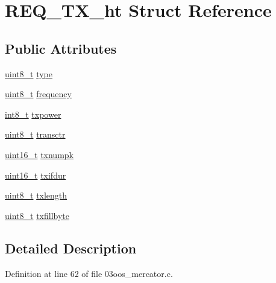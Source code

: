 \hypertarget{struct_r_e_q___t_x__ht}{}\section{R\+E\+Q\+\_\+\+T\+X\+\_\+ht Struct Reference}
\label{struct_r_e_q___t_x__ht}
\subsection*{Public Attributes}
\begin{DoxyCompactItemize}
\item 
\hyperlink{_p_e___types_8h_aba7bc1797add20fe3efdf37ced1182c5}{uint8\+\_\+t} \hyperlink{struct_r_e_q___t_x__ht_ac11d6ac1b582ca7e7b6dcacbb19af288}{type}
\item 
\hyperlink{_p_e___types_8h_aba7bc1797add20fe3efdf37ced1182c5}{uint8\+\_\+t} \hyperlink{struct_r_e_q___t_x__ht_a74c294feb13b830ee7158ad22ee13300}{frequency}
\item 
\hyperlink{_p_e___types_8h_aef44329758059c91c76d334e8fc09700}{int8\+\_\+t} \hyperlink{struct_r_e_q___t_x__ht_a5304263e364d8eb01026fa8375b48c04}{txpower}
\item 
\hyperlink{_p_e___types_8h_aba7bc1797add20fe3efdf37ced1182c5}{uint8\+\_\+t} \hyperlink{struct_r_e_q___t_x__ht_a4c78ef7cfae1a8937177c1cc2295636a}{transctr}
\item 
\hyperlink{_p_e___types_8h_a1f1825b69244eb3ad2c7165ddc99c956}{uint16\+\_\+t} \hyperlink{struct_r_e_q___t_x__ht_af4641683362ba6d5583558927f6b774f}{txnumpk}
\item 
\hyperlink{_p_e___types_8h_a1f1825b69244eb3ad2c7165ddc99c956}{uint16\+\_\+t} \hyperlink{struct_r_e_q___t_x__ht_a01136c9dfea9e9d4b5c07b27bbbd9663}{txifdur}
\item 
\hyperlink{_p_e___types_8h_aba7bc1797add20fe3efdf37ced1182c5}{uint8\+\_\+t} \hyperlink{struct_r_e_q___t_x__ht_aa0e131a829a40e3458e9c90df6a1fb6e}{txlength}
\item 
\hyperlink{_p_e___types_8h_aba7bc1797add20fe3efdf37ced1182c5}{uint8\+\_\+t} \hyperlink{struct_r_e_q___t_x__ht_ab8913f4c071c5009e6c05ea46cd40e65}{txfillbyte}
\end{DoxyCompactItemize}


\subsection{Detailed Description}


Definition at line 62 of file 03oos\+\_\+mercator.\+c.




